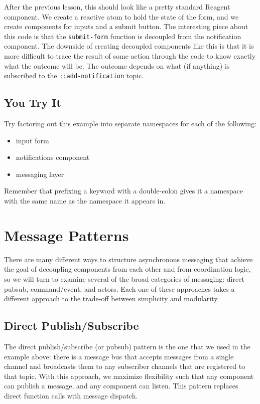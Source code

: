 \documentclass[10pt,twoside,openright]{memoir}
\begin{document}
After the previous lesson, this should look like a pretty standard
Reagent component. We create a reactive atom to hold the state of the
form, and we create components for inputs and a submit button. The
interesting piece about this code is that the \texttt{submit-form}
function is decoupled from the notification component. The downside of
creating decoupled components like this is that it is more difficult to
trace the result of some action through the code to know exactly what
the outcome will be. The outcome depends on what (if anything) is
subscribed to the \texttt{::add-notification} topic.


\subsection{You Try It}

Try factoring out this example into separate namespaces for each of the following:

\begin{itemize}
\tightlist
\item input form
\item notifications component
\item messaging layer
\end{itemize}

Remember that prefixing a keyword with a double-colon gives it a namespace with
the same name as the namespace it appears in.


\section{Message Patterns}

There are many different ways to structure asynchronous messaging that
achieve the goal of decoupling components from each other and from
coordination logic, so we will turn to examine several of the broad
categories of messaging: direct pubsub, command/event, and actors. Each
one of these approaches takes a different approach to the trade-off
between simplicity and modularity.


\subsection{Direct Publish/Subscribe}

The direct publish/subscribe (or pubsub) pattern is the one that we used
in the example above: there is a message bus that accepts messages from
a single channel and broadcasts them to any subscriber channels that are
registered to that topic. With this approach, we maximize flexibility
such that any component can publish a message, and any component can
listen. This pattern replaces direct function calls with message
dispatch.
\end{document}
